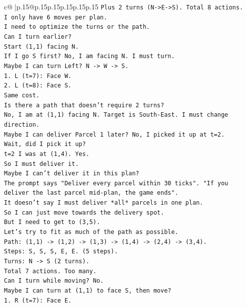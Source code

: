\documentclass{article}
\begin{document}
{\begin{supertabular}{c@{$\;$}|p{.15\linewidth}@{}p{.15\linewidth}p{.15\linewidth}p{.15\linewidth}p{.15\linewidth}p{.15\linewidth}}
{{{\texttt{Plus 2 turns (N{-}>E{-}>S). Total 8 actions.} \\
\texttt{I only have 6 moves per plan.} \\
\texttt{I need to optimize the turns or the path.} \\
\texttt{Can I turn earlier?} \\
\texttt{Start (1,1) facing N.} \\
\texttt{If I go S first? No, I am facing N. I must turn.} \\
\texttt{Maybe I can turn Left? N {-}> W {-}> S.} \\
\texttt{1. L (t=7): Face W.} \\
\texttt{2. L (t=8): Face S.} \\
\texttt{Same cost.} \\
\texttt{Is there a path that doesn't require 2 turns?} \\
\texttt{No, I am at (1,1) facing N. Target is South{-}East. I must change direction.} \\
\texttt{Maybe I can deliver Parcel 1 later? No, I picked it up at t=2.} \\
\texttt{Wait, did I pick it up?} \\
\texttt{t=2 I was at (1,4). Yes.} \\
\texttt{So I must deliver it.} \\
\texttt{Maybe I can't deliver it in this plan?} \\
\texttt{The prompt says "Deliver every parcel within 30 ticks". "If you deliver the last parcel mid{-}plan, the game ends".} \\
\texttt{It doesn't say I must deliver *all* parcels in one plan.} \\
\texttt{So I can just move towards the delivery spot.} \\
\texttt{But I need to get to (3,5).} \\
\texttt{Let's try to fit as much of the path as possible.} \\
\texttt{Path: (1,1) {-}> (1,2) {-}> (1,3) {-}> (1,4) {-}> (2,4) {-}> (3,4).} \\
\texttt{Steps: S, S, S, E, E. (5 steps).} \\
\texttt{Turns: N {-}> S (2 turns).} \\
\texttt{Total 7 actions. Too many.} \\
\texttt{Can I turn while moving? No.} \\
\texttt{Maybe I can turn at (1,1) to face S, then move?} \\
\texttt{1. R (t=7): Face E.} \\
}}}
\end{supertabular}}
\end{document}
